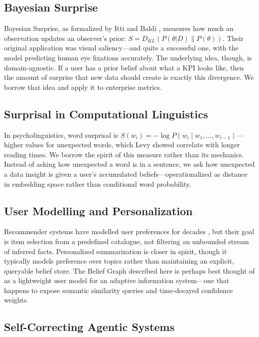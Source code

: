 \documentclass[conference]{IEEEtran}
\begin{document}
\subsection{Bayesian Surprise}

Bayesian Surprise, as formalized by Itti and Baldi
\cite{itti2009bayesian}, measures how much an observation updates
an observer's prior: $S = D_{KL}(P(\theta|D) \| P(\theta))$. Their
original application was visual saliency---and quite a successful one,
with the model predicting human eye fixations accurately. The underlying
idea, though, is domain-agnostic. If a user has a prior belief about
what a KPI looks like, then the amount of surprise that new data should
create is exactly this divergence. We borrow that idea and apply
it to enterprise metrics.

\subsection{Surprisal in Computational Linguistics}

In psycholinguistics, word surprisal \cite{hale2001probabilistic}
is $S(w_i) = -\log P(w_i \mid w_1, \ldots, w_{i-1})$---higher values
for unexpected words, which Levy \cite{levy2008expectation} showed
correlate with longer reading times. We borrow the spirit of this
measure rather than its mechanics. Instead of asking how unexpected
a word is in a sentence, we ask how unexpected a data insight is
given a user's accumulated beliefs---operationalized as distance in
embedding space rather than conditional word probability.

\subsection{User Modelling and Personalization}

Recommender systems have modelled user preferences for decades
\cite{koren2009matrix}, but their goal is item selection from a
predefined catalogue, not filtering an unbounded stream of inferred
facts. Personalized summarization \cite{zhong2019searching} is closer
in spirit, though it typically models preference over topics rather
than maintaining an explicit, queryable belief store. The Belief Graph
described here is perhaps best thought of as a lightweight user model
for an adaptive information system---one that happens to expose
semantic similarity queries and time-decayed confidence weights.

\subsection{Self-Correcting Agentic Systems}
\end{document}
